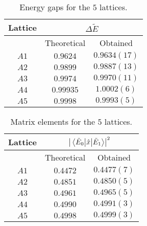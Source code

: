 \begin{table}[h!]
\centering
\begin{tabular}{@{}ccc@{}}
\toprule
Lattice              & \multicolumn{2}{c}{$\Delta\tilde{E}$} \\ \midrule
                     & Theoretical       & Obtained          \\
$A1$                 & $0.9624$          & $0.9634(17)$      \\
$A2$                 & $0.9899$          & $0.9887(13)$      \\
$A3$                 & $0.9974$          & $0.9970(11)$      \\
$A4$                 & $0.99935$         & $1.0002(6)$       \\
$A5$                 & $0.9998$          & $0.9993(5)$       \\ \bottomrule
\end{tabular}
 \caption{Energy gaps for the $5$ lattices.}
 \label{tab:energyresults}
\end{table}
\begin{table}[h!]
  \centering
\begin{tabular}{@{}ccc@{}}
\toprule
Lattice & \multicolumn{2}{c}{$\abs{\mel{\tilde{E}_0}{\hat{x}}{\tilde{E}_1}} ^2$}           \\ \midrule
                     & Theoretical       & Obtained          \\
$A1$                 & $0.4472$          & $0.4477(7)$       \\
$A2$                 & $0.4851$          & $0.4850(5)$       \\
$A3$                 & $0.4961$          & $0.4965(5)$       \\
$A4$                 & $0.4990$          & $0.4991(3)$       \\
$A5$                 & $0.4998$          & $0.4999(3)$       \\ \bottomrule
\end{tabular}
\caption{Matrix elements for the $5$ lattices.}
\label{tab:matrixresults}
\end{table}
